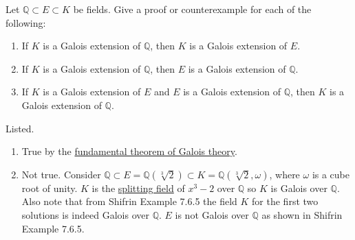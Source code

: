   \begin{exercise}[Shifrin 7.6.11]
    Let $\mathbb{Q} \subset E \subset K$ be fields. Give a proof or counterexample for each of the following:
    \begin{enumerate}[label=\alph*.]
      \item If $K$ is a Galois extension of $\mathbb{Q}$, then $K$ is a Galois extension of $E$.
      \item If $K$ is a Galois extension of $\mathbb{Q}$, then $E$ is a Galois extension of $\mathbb{Q}$.
      \item If $K$ is a Galois extension of $E$ and $E$ is a Galois extension of $\mathbb{Q}$, then $K$ is a Galois extension of $\mathbb{Q}$.
    \end{enumerate}
  \end{exercise}
  \begin{solution}
    Listed.  
    \begin{enumerate}
      \item True by the \hyperref[thm:fundamental-theorem-of-galois-theory]{fundamental theorem of Galois theory}. 

      \item Not true. Consider $\mathbb{Q} \subset E = \mathbb{Q}(\sqrt[3]{2}) \subset K = \mathbb{Q}(\sqrt[3]{2}, \omega)$, where $\omega$ is a cube root of unity. $K$ is the \hyperref[def:splitting-field]{splitting field} of $x^3 - 2$ over $\mathbb{Q}$ so $K$ is Galois over $\mathbb{Q}$. Also note that from Shifrin Example 7.6.5 the field $K$ for the first two solutions is indeed Galois over $\mathbb{Q}$. $E$ is not Galois over $\mathbb{Q}$ as shown in Shifrin Example 7.6.5. 


\end{enumerate}
\end{solution}
